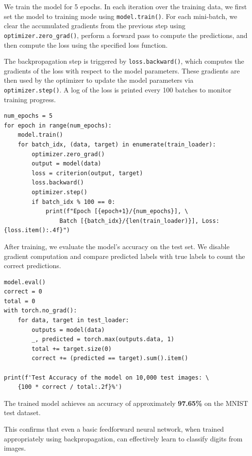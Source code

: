 We train the model for 5 epochs. In each iteration over the training data, we first set the model to training mode using \texttt{model.train()}. For each mini-batch, we clear the accumulated gradients from the previous step using \texttt{optimizer.zero\_grad()}, perform a forward pass to compute the predictions, and then compute the loss using the specified loss function. 

The backpropagation step is triggered by \texttt{loss.backward()}, which computes the gradients of the loss with respect to the model parameters. These gradients are then used by the optimizer to update the model parameters via \texttt{optimizer.step()}. A log of the loss is printed every 100 batches to monitor training progress.


\begin{tcolorbox}[codebox]
\begin{verbatim}
num_epochs = 5
for epoch in range(num_epochs):
    model.train()
    for batch_idx, (data, target) in enumerate(train_loader):
        optimizer.zero_grad()
        output = model(data)
        loss = criterion(output, target)
        loss.backward()
        optimizer.step()
        if batch_idx % 100 == 0:
            print(f"Epoch [{epoch+1}/{num_epochs}], \
                Batch [{batch_idx}/{len(train_loader)}], Loss: {loss.item():.4f}")
\end{verbatim}
\end{tcolorbox}


After training, we evaluate the model’s accuracy on the test set. We disable gradient computation and compare predicted labels with true labels to count the correct predictions.

\begin{tcolorbox}[codebox]
\begin{verbatim}
model.eval()
correct = 0
total = 0
with torch.no_grad():
    for data, target in test_loader:
        outputs = model(data)
        _, predicted = torch.max(outputs.data, 1)
        total += target.size(0)
        correct += (predicted == target).sum().item()

print(f'Test Accuracy of the model on 10,000 test images: \
    {100 * correct / total:.2f}%')
\end{verbatim}  
\end{tcolorbox}


The trained model achieves an accuracy of approximately \textbf{97.65\%} on the MNIST test dataset. 

This confirms that even a basic feedforward neural network, when trained appropriately using backpropagation, can effectively learn to classify digits from images.